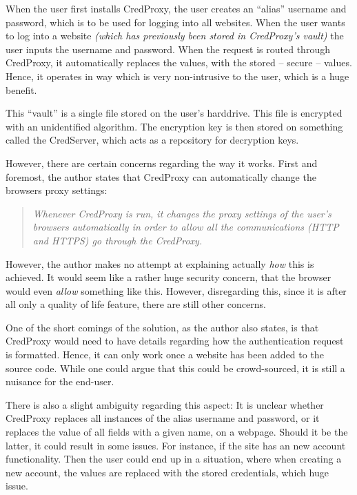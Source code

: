 			When the user first installs CredProxy, the user creates an ``alias'' username and password, which is to be used for logging into all websites. When the user wants to log into a website \emph{(which has previously been stored in CredProxy's vault)} the user inputs the username and password. When the request is routed through CredProxy, it automatically replaces the values, with the stored -- secure -- values. Hence, it operates in way which is very non-intrusive to the user, which is a huge benefit.

			This ``vault'' is a single file stored on the user's harddrive. This file is encrypted with an unidentified algorithm. The encryption key is then stored on something called the CredServer, which acts as a repository for decryption keys.

			However, there are certain concerns regarding the way it works. First and foremost, the author states that CredProxy can automatically change the browsers proxy settings:
			\begin{quote}
				\emph{Whenever CredProxy is run, it changes the proxy settings of the user’s browsers automatically
						in order to allow all the communications (HTTP and HTTPS) go through the CredProxy.}\\\cite[p.53]{golrang2013}
			\end{quote}

			However, the author makes no attempt at explaining actually \emph{how} this is achieved. It would seem like a rather huge security concern, that the browser would even \emph{allow} something like this. However, disregarding this, since it is after all only a quality of life feature, there are still other concerns.

			One of the short comings of the solution, as the author also states, is that CredProxy would need to have details regarding how the authentication request is formatted. Hence, it can only work once a website has been added to the source code. While one could argue that this could be crowd-sourced, it is still a nuisance for the end-user. 

			There is also a slight ambiguity regarding this aspect: It is unclear whether CredProxy replaces all instances of the alias username and password, or it replaces the value of all fields with a given name, on a webpage. Should it be the latter, it could result in some issues. For instance, if the site has an new account functionality. Then the user could end up in a situation, where when creating a new account, the values are replaced with the stored credentials, which huge issue.

